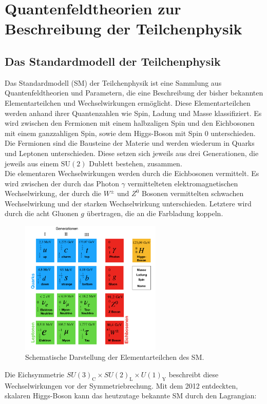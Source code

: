 \chapter{Quantenfeldtheorien zur Beschreibung der Teilchenphysik}
\section{Das Standardmodell der Teilchenphysik}
Das Standardmodell (SM) der Teilchenphysik ist eine Sammlung aus Quantenfeldtheorien und Parametern, die eine Beschreibung der bisher bekannten Elementarteilchen und Wechselwirkungen ermöglicht. Diese Elementarteilchen werden anhand ihrer Quantenzahlen wie Spin, Ladung und Masse klassifiziert.
Es wird zwischen den Fermionen mit einem halbzaligen Spin und den Eichbosonen mit einem ganzzahligen Spin, sowie dem Higgs-Boson mit Spin $0$ unterschieden. Die Fermionen sind die Bausteine der Materie und werden wiederum in Quarks und Leptonen unterschieden. Diese setzen sich jeweils aus drei Generationen, die jeweils aus einem $\text{SU}(2)$ Dublett bestehen, zusammen.\\
Die elementaren Wechselwirkungen werden durch die Eichbosonen vermittelt. Es wird zwischen der durch das Photon $\gamma$ vermittelteten elektromagnetischen Wechselwirkung, der durch die $W^{\pm}$ und $Z^0$ Bosonen vermittelten schwachen Wechselwirkung und der starken Wechselwirkung unterschieden. Letztere wird durch die acht Gluonen $g$ übertragen, die an die Farbladung koppeln.\\
\begin{figure}[H]
  \centering
  \includegraphics[width=0.6\textwidth]{Plots/SM.png}
  \caption{Schematische Darstellung der Elementarteilchen des SM\cite{Patrignani:2016xqp}.}
\end{figure}
Die Eichsymmetrie $SU(3)_\text{C} \times SU(2)_\text{L} \times U(1)_\text{Y}$ beschreibt diese Wechselwirkungen vor der Symmetriebrechung. Mit dem 2012 entdeckten, skalaren Higgs-Boson \cite{ Aad:2012tfa}\cite{Chatrchyan:2012xdj} kann das heutzutage bekannte SM durch den Lagrangian:
